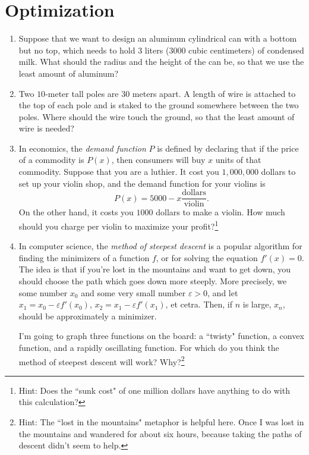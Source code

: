 \documentclass[reqno,12pt,letterpaper]{amsart}
\theoremstyle{definition}
\numberwithin{equation}{section}
\begin{document}
\section{Optimization}
\begin{enumerate}
\item Suppose that we want to design an aluminum cylindrical can with a bottom but no top, which needs to hold $3$ liters ($3000$ cubic centimeters) of condensed milk. What should the radius and the height of the can be, so that we use the least amount of aluminum?
\item Two $10$-meter tall poles are $30$ meters apart. A length of wire is attached to the top of each pole and is staked to the ground somewhere between the two poles. Where should the wire touch the ground, so that the least amount of wire is needed?
\item In economics, the \emph{demand function} $P$ is defined by declaring that if the price of a commodity is $P(x)$, then consumers will buy $x$ units of that commodity.
Suppose that you are a luthier. It cost you $1,000,000$ dollars to set up your violin shop, and the demand function for your violins is
$$P(x) = 5000 - x \frac{\text{dollars}}{\text{violin}}.$$
On the other hand, it costs you $1000$ dollars to make a violin.
How much should you charge per violin to maximize your profit?\footnote{Hint: Does the ``sunk cost" of one million dollars have anything to do with this calculation?}
\item In computer science, the \emph{method of steepest descent} is a popular algorithm for finding the minimizers of a function $f$, or for solving the equation $f'(x) = 0$.
The idea is that if you're lost in the mountains and want to get down, you should choose the path which goes down more steeply.
More precisely, we some number $x_0$ and some very small number $\varepsilon > 0$, and let $x_1 = x_0 - \varepsilon f'(x_0)$, $x_2 = x_1 - \varepsilon f'(x_1)$, et cetra.
Then, if $n$ is large, $x_n$, should be approximately a minimizer.

I'm going to graph three functions on the board: a ``twisty" function, a convex function, and a rapidly oscillating function.
For which do you think the method of steepest descent will work? Why?\footnote{Hint: The ``lost in the mountains" metaphor is helpful here. Once I was lost in the mountains and wandered for about six hours, because taking the paths of descent didn't seem to help.}
\end{enumerate}
\end{document}
